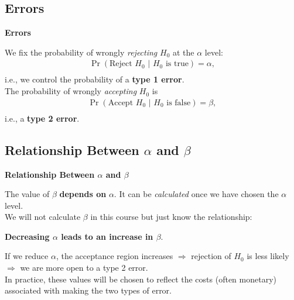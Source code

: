 \documentclass[compress]{beamer}        %
\makeatletter
\newcommand{\tcb}{\textcolor{beamer@blendedblue}}
\makeatother
\begin{document}
\subsection{Errors}
\begin{frame}{\bf \tcb{Errors}}

We fix the probability of wrongly \emph{rejecting} $H_0$ at the $\alpha$ level:\\[-0.2cm]
\begin{align*}
\Pr(\text{Reject } H_0 \,\,|\,\, H_0 \text{ is true}) = \alpha,\\[-0.2cm]
\end{align*}
i.e., we control the probability of a {\bf type 1 error}.\\[1cm]

The probability of wrongly \emph{accepting} $H_0$ is\\[-0.2cm]
\begin{align*}
\Pr(\text{Accept } H_0 \,\,|\,\, H_0 \text{ is false}) = \beta,\\[-0.2cm]
\end{align*}
i.e., a {\bf type 2 error}.

\end{frame}


\subsection{Relationship Between $\alpha$ and $\beta$}
\begin{frame}{\bf \tcb{Relationship Between $\alpha$ and $\beta$}}

The value of $\beta$ {\bf depends on} $\alpha$. It can be \emph{calculated} once we have chosen the $\alpha$ level.\\[0.8cm]

We will not calculate $\beta$ in this course but just know the relationship:\\[0.5cm]
\begin{center}
{\bf Decreasing {\boldmath$\alpha$} leads to an increase in {\boldmath$\beta$}}.\\[0.5cm]
\end{center}

If we reduce $\alpha$, the acceptance region increases $\Rightarrow$ rejection of $H_0$ is less likely $\Rightarrow$ we are more open to a type 2 error.\\[0.8cm]

In practice, these values will be chosen to reflect the costs (often monetary) associated with making the two types of error.

\end{frame}
\end{document}

